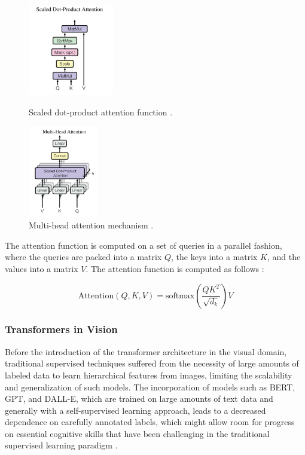 \documentclass[english, 12pt, a4paper, elec, utf8, a-2b, online]{aaltothesis}
\begin{document}
\begin{figure}[H]
    \centering
    \begin{minipage}{.4\textwidth}
        \centering
        \includegraphics[height=4cm]{images/attention_qkv.png}
        \caption{Scaled dot-product attention function \cite{Vaswani2017}.}
        \label{fig:attention_qkv}
    \end{minipage}%
    \begin{minipage}{.4\textwidth}
        \centering
        \includegraphics[height=4cm]{images/multihead_attention.png}
        \caption{Multi-head attention mechanism \cite{Vaswani2017}.}
        \label{fig:multihead_attention}
    \end{minipage}
\end{figure}

The attention function is computed on a set of queries in a parallel fashion, where the queries are packed into a matrix $Q$, the keys into a matrix $K$, and the values into a matrix $V$.
The attention function is computed as follows \cite{Vaswani2017}:

\begin{equation}
    \text{Attention}(Q, K, V) = \text{softmax}\left(\frac{QK^T}{\sqrt{d_k}}\right)V
\end{equation}

\subsubsection{Transformers in Vision}

Before the introduction of the transformer architecture in the visual domain, traditional supervised techniques suffered from the necessity of large amounts of labeled data to learn hierarchical features from images, limiting the scalability and generalization of such models.
The incorporation of models such as BERT, GPT, and DALL-E, which are trained on large amounts of text data and generally with a self-supervised learning approach, leads to a decreased dependence on carefully annotated labels, which might allow room for progress on essential cognitive skills that have been challenging in the traditional supervised learning paradigm \cite{Bommasani2021, Zellers2019, Martin2023}.
\end{document}
